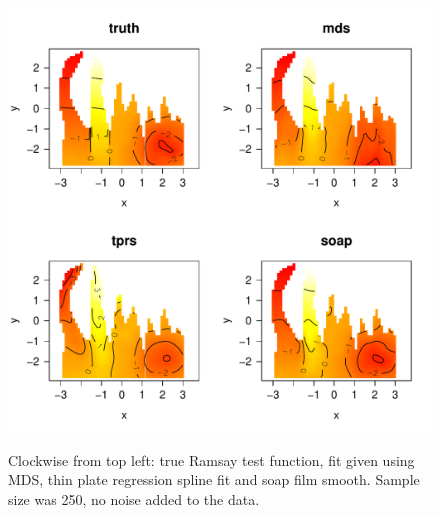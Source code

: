 \documentclass[a4paper,10pt]{article}
\begin{document}
%

\begin{figure}
\centering
\includegraphics[width=6in]{figs/wt2-mds-smooth-noerr.pdf}\\
\caption{Clockwise from top left: true Ramsay test function, fit given using MDS, thin plate regression spline fit and soap film smooth. Sample size was 250, no noise added to the data.}
\label{wt2-mds-smooth-noerr}
\end{figure}
\end{document}
